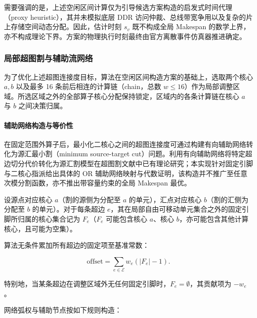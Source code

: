\documentclass[anonymous,withtoc]{gmcm2026}
\begin{document}
需要强调的是，上述空闲区间计算仅为引导候选方案构造的启发式时间代理（proxy heuristic），其并未模拟底层 DDR 访问仲裁、总线带宽争用以及复杂的片上存储空间动态分配。因此，估计时刻 \(s_v\) 既不构成全局 Makespan 的数学上界，亦不构成理论下界。方案的物理执行时刻最终由官方离散事件仿真器推进确定。

\subsubsection{局部超图割与辅助流网络}

为了优化上述超图连接度目标，算法在空闲区间构造方案的基础上，选取两个核心 \(a, b\) 以及最多 16 条前后相连的计算链（chain，总数 \(w \le 16\)）作为局部调整区域。所选区域之外的全部算子核心分配保持锁定，区域内的各条计算链在核心 \(a\) 与 \(b\) 之间决策归属。

\paragraph{辅助网络构造与等价性}

在固定范围外算子后，最小化二核心之间的超图连接度可通过构建有向辅助网络转化为源汇最小割（minimum source-target cut）问题。利用有向辅助网络将特定超边切分代价转化为源汇割模型在超图割文献中已有理论研究\cite{ref8}；本实现针对固定引脚与二核心指派给出具体的 OR 辅助网络映射与代数证明，该构造并不推广至任意次模分割函数，亦不推出带容量约束的全局 Makespan 最优。

设源点对应核心 \(a\)（割的源侧为分配至 \(a\) 的单元），汇点对应核心 \(b\)（割的汇侧为分配至 \(b\) 的单元）。对于每条超边 \(e\)，其在局部自由可移动单元集合之外的固定引脚所归属的核心集合记为 \(F_e\)（\(F_e\) 可能包含核心 \(a\)、核心 \(b\)，亦可能包含其他计算核心，且可能为空集）。

算法无条件累加所有超边的固定项至基准常数：

\begin{equation}
\text{offset} = \sum_{e \in \mathcal{E}} w_e (|F_e| - 1).
\end{equation}

特别地，当某条超边在调整区域外无任何固定引脚时，\(F_e = \emptyset\)，其贡献项为 \(-w_e\)。

网络弧权与辅助节点按如下规则构造：
\end{document}
